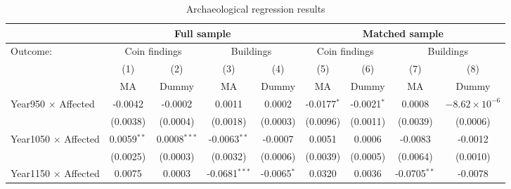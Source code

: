 \documentclass[11pt]{article}
\begin{document}
\begin{landscape}
\begin{table}
\centering
\caption{Archaeological regression results} \label{tab:arch1}
\footnotesize
\begin{tabular}{lcccccccc}
   \tabularnewline \midrule \midrule
                                                    & \multicolumn{4}{c}{Full sample}                                                    & \multicolumn{4}{c}{Matched sample} \\
   \midrule
   Outcome:                                         & \multicolumn{2}{c}{Coin findings} & \multicolumn{2}{c}{Buildings}                  & \multicolumn{2}{c}{Coin findings}               & \multicolumn{2}{c}{Buildings}\\
                                                    & (1)             & (2)             & (3)                   & (4)                    & (5)                    & (6)                    & (7)            & (8)\\  
                                                    & MA              & Dummy           & MA                    & Dummy                  & MA                     & Dummy                  & MA             & Dummy \\ 
   \midrule
   Year950 $\times$ Affected                        & -0.0042         & -0.0002         & 0.0011                & 0.0002                 & -0.0177$^{*}$          & -0.0021$^{*}$          & 0.0008          & $-8.62\times 10^{-6}$\\    
                                                    & (0.0038)        & (0.0004)        & (0.0018)              & (0.0003)               & (0.0096)               & (0.0011)               & (0.0039)        & (0.0006)\\   
   Year1050 $\times$ Affected                       & 0.0059$^{**}$   & 0.0008$^{***}$  & -0.0063$^{**}$        & -0.0007                & 0.0051                 & 0.0006                 & -0.0083         & -0.0012\\   
                                                    & (0.0025)        & (0.0003)        & (0.0032)              & (0.0006)               & (0.0039)               & (0.0005)               & (0.0064)        & (0.0010)\\   
   Year1150 $\times$ Affected                       & 0.0075          & 0.0003          & -0.0681$^{***}$       & -0.0065$^{*}$          & 0.0320                 & 0.0036                 & -0.0705$^{**}$  & -0.0078\\   

\end{tabular}
\end{table}
\end{landscape}
\end{document}
